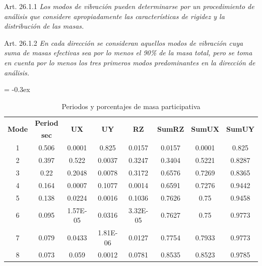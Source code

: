\documentclass[12pt]{article}
\begin{document}
\begin{mybox3}{Art. 26.1.1}
\textit{Los modos de vibración pueden determinarse por un procedimiento de análisis que considere apropiadamente las características de rigidez y la distribución de las masas.}
\end{mybox3}

\begin{mybox3}{Art. 26.1.2}
\textit{En cada dirección se consideran aquellos modos de vibración cuya suma de masas efectivas sea por lo menos el 90\% de la masa total, pero se toma en 
cuenta por lo menos los tres primeros modos predominantes en la dirección de 
análisis.}
\end{mybox3}

\begin{table}[h!]
  \centering
  \caption{Periodos y porcentajes de masa participativa}
    {
\extrarowheight = -0.3ex
\renewcommand{\arraystretch}{1.3}
    \begin{tabular}{|c|c|c|c|c|c|c|c|}
    \hline
    \multicolumn{1}{|c|}{\multirow{2}[4]{*}{\textbf{Mode}}} & \multicolumn{1}{c|}{\textbf{Period}} & \multicolumn{1}{c|}{\multirow{2}[4]{*}{\textbf{UX}}} & \multicolumn{1}{c|}{\multirow{2}[4]{*}{\textbf{UY}}} & \multicolumn{1}{c|}{\multirow{2}[4]{*}{\textbf{RZ}}} & \multicolumn{1}{c|}{\multirow{2}[4]{*}{\textbf{SumRZ}}} & \multicolumn{1}{c|}{\multirow{2}[4]{*}{\textbf{SumUX}}} & \multicolumn{1}{c|}{\multirow{2}[4]{*}{\textbf{SumUY}}} \\
\cline{2-2}          & \multicolumn{1}{c|}{\textbf{sec}} &       &       &       &       &       &  \\
    \hline
    1     & 0.506 & 0.0001 & 0.825 & 0.0157 & 0.0157 & 0.0001 & 0.825 \\
    \hline
    2     & 0.397 & 0.522 & 0.0037 & 0.3247 & 0.3404 & 0.5221 & 0.8287 \\
    \hline
    3     & 0.22  & 0.2048 & 0.0078 & 0.3172 & 0.6576 & 0.7269 & 0.8365 \\
    \hline
    4     & 0.164 & 0.0007 & 0.1077 & 0.0014 & 0.6591 & 0.7276 & 0.9442 \\
    \hline
    5     & 0.138 & 0.0224 & 0.0016 & 0.1036 & 0.7626 & 0.75  & 0.9458 \\
    \hline
    6     & 0.095 & 1.57E-05 & 0.0316 & 3.32E-05 & 0.7627 & 0.75  & 0.9773 \\
    \hline
    7     & 0.079 & 0.0433 & 1.81E-06 & 0.0127 & 0.7754 & 0.7933 & 0.9773 \\
    \hline
    8     & 0.073 & 0.059 & 0.0012 & 0.0781 & 0.8535 & 0.8523 & 0.9785 \\

\end{tabular}}
\end{table}
\end{document}
